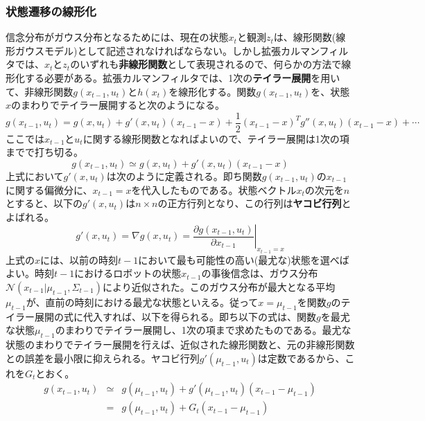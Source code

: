 \documentclass[dvipdfmx,a4paper]{jsarticle}
\begin{document}
\subsubsection{状態遷移の線形化}
信念分布がガウス分布となるためには、現在の状態$x_t$と観測$z_t$は、線形関数(線形ガウスモデル)として記述されなければならない。しかし拡張カルマンフィルタでは、$x_t$と$z_t$のいずれも\textbf{非線形関数}として表現されるので、何らかの方法で線形化する必要がある。拡張カルマンフィルタでは、1次の\textbf{テイラー展開}を用いて、非線形関数$g(x_{t - 1}, u_t)$と$h(x_t)$を線形化する。関数$g(x_{t - 1}, u_t)$を、状態$x$のまわりでテイラー展開すると次のようになる。
\begin{equation}
	g(x_{t - 1}, u_t) = g(x, u_t) + g'(x, u_t) \left( x_{t - 1} - x \right) + \frac{1}{2} \left( x_{t - 1} - x \right)^T g''(x, u_t) \left( x_{t - 1} - x \right) + \cdots
\end{equation}
ここでは$x_{t - 1}$と$u_t$に関する線形関数となればよいので、テイラー展開は1次の項までで打ち切る。
\begin{equation}
	g(x_{t - 1}, u_t) \simeq g(x, u_t) + g'(x, u_t) \left( x_{t - 1} - x \right)
\end{equation}
上式において$g'(x, u_t)$は次のように定義される。即ち関数$g(x_{t - 1}, u_t)$の$x_{t - 1}$に関する偏微分に、$x_{t - 1} = x$を代入したものである。状態ベクトル$x_t$の次元を$n$とすると、以下の$g'(x, u_t)$は$n \times n$の正方行列となり、この行列は\textbf{ヤコビ行列}とよばれる。
\begin{equation}
	g'(x, u_t) = \nabla g(x, u_t) = \left. \frac{\partial g(x_{t - 1}, u_t)}{\partial x_{t - 1}} \right|_{x_{t - 1} = x}
\end{equation}
上式の$x$には、以前の時刻$t - 1$において最も可能性の高い(最尤な)状態を選べばよい。時刻$t - 1$におけるロボットの状態$x_{t - 1}$の事後信念は、ガウス分布$\mathcal{N}(x_{t - 1} | \mu_{t - 1}, \Sigma_{t - 1})$により近似された。このガウス分布が最大となる平均$\mu_{t - 1}$が、直前の時刻における最尤な状態といえる。従って$x = \mu_{t - 1}$を関数$g$のテイラー展開の式に代入すれば、以下を得られる。即ち以下の式は、関数$g$を最尤な状態$\mu_{t - 1}$のまわりでテイラー展開し、1次の項まで求めたものである。最尤な状態のまわりでテイラー展開を行えば、近似された線形関数と、元の非線形関数との誤差を最小限に抑えられる。ヤコビ行列$g'(\mu_{t - 1}, u_t)$は定数であるから、これを$G_t$とおく。
\begin{eqnarray}
	g(x_{t - 1}, u_t) &\simeq& g(\mu_{t - 1}, u_t) + g'(\mu_{t - 1}, u_t) \left( x_{t - 1} - \mu_{t - 1} \right) \\
	&=& g(\mu_{t - 1}, u_t) + G_t \left( x_{t - 1} - \mu_{t - 1} \right)
\end{eqnarray}
\end{document}
